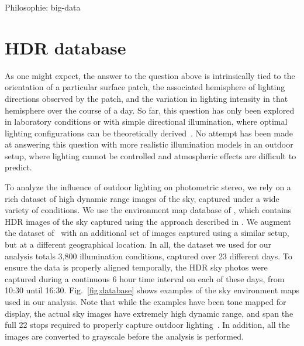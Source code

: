 \documentclass{report}
\begin{document}
Philosophie: big-data

\section{HDR database}

As one might expect, the answer to the question above is intrinsically tied to the orientation of a particular surface patch, the associated hemisphere of lighting directions observed by the patch, and the variation in lighting intensity in that hemisphere over the course of a day. So far, this question has only been explored in laboratory conditions or with simple directional illumination, where optimal lighting configurations can be theoretically derived~\cite{drbohlav-iccv-05,klaudiny-prl-14,shen-pg-14}. No attempt has been made at answering this question with more realistic illumination models in an outdoor setup, where lighting cannot be controlled and atmospheric effects are difficult to predict.

To analyze the influence of outdoor lighting on photometric stereo, we rely on a rich dataset of high dynamic range images of the sky, captured under a wide variety of conditions. We use the environment map database of \cite{lalonde-3dv-14}, which contains HDR images of the sky captured using the approach described in \cite{stumpfel-afrigraph-04}. We augment the dataset of~\cite{lalonde-3dv-14} with an additional set of images captured using a similar setup, but at a different geographical location. In all, the dataset we used for our analysis totals 3,800 illumination conditions, captured over 23 different days. To ensure the data is properly aligned temporally, the HDR sky photos were captured during a continuous 6 hour time interval on each of these days, from 10:30 until 16:30. Fig.~\ref{fig:database} shows examples of the sky environment maps used in our analysis. Note that while the examples have been tone mapped for display, the actual sky images have extremely high dynamic range, and span the full 22 stops required to properly capture outdoor lighting~\cite{stumpfel-afrigraph-04}. In addition, all the images are converted to grayscale before the analysis is performed.
\end{document}
